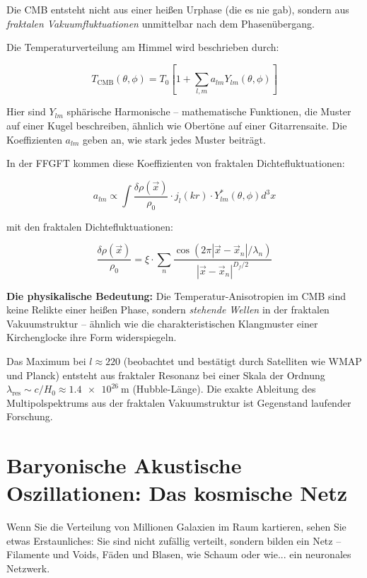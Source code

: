 Die CMB entsteht nicht aus einer heißen Urphase (die es nie gab), sondern aus \textit{fraktalen Vakuumfluktuationen} unmittelbar nach dem Phasenübergang.

Die Temperaturverteilung am Himmel wird beschrieben durch:

\begin{equation}
T_{\text{CMB}}(\theta, \phi) = T_0 \left[1 + \sum_{l,m} a_{lm} Y_{lm}(\theta, \phi)\right]
\end{equation}

Hier sind $Y_{lm}$ sphärische Harmonische -- mathematische Funktionen, die Muster auf einer Kugel beschreiben, ähnlich wie Obertöne auf einer Gitarrensaite. Die Koeffizienten $a_{lm}$ geben an, wie stark jedes Muster beiträgt.

In der FFGFT kommen diese Koeffizienten von fraktalen Dichtefluktuationen:

\begin{equation}
a_{lm} \propto \int \frac{\delta \rho(\vec{x})}{\rho_0} \cdot j_l(kr) \cdot Y_{lm}^*(\theta, \phi) d^3x
\end{equation}

mit den fraktalen Dichtefluktuationen:

\begin{equation}
\frac{\delta \rho(\vec{x})}{\rho_0} = \xi \cdot \sum_n \frac{\cos(2\pi |\vec{x} - \vec{x}_n|/\lambda_n)}{|\vec{x} - \vec{x}_n|^{D_f/2}}
\end{equation}

\textbf{Die physikalische Bedeutung:} Die Temperatur-Anisotropien im CMB sind keine Relikte einer heißen Phase, sondern \textit{stehende Wellen} in der fraktalen Vakuumstruktur -- ähnlich wie die charakteristischen Klangmuster einer Kirchenglocke ihre Form widerspiegeln.

Das Maximum bei $l \approx 220$ (beobachtet und bestätigt durch Satelliten wie WMAP und Planck) entsteht aus fraktaler Resonanz bei einer Skala der Ordnung $\lambda_{\text{res}} \sim c/H_0 \approx \SI{1.4e26}{\meter}$ (Hubble-Länge). Die exakte Ableitung des Multipolspektrums aus der fraktalen Vakuumstruktur ist Gegenstand laufender Forschung.

\section{Baryonische Akustische Oszillationen: Das kosmische Netz}

Wenn Sie die Verteilung von Millionen Galaxien im Raum kartieren, sehen Sie etwas Erstaunliches: Sie sind nicht zufällig verteilt, sondern bilden ein Netz -- Filamente und Voids, Fäden und Blasen, wie Schaum oder wie... ein neuronales Netzwerk.

